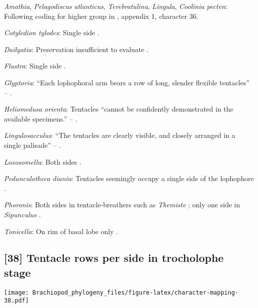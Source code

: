 \documentclass[openany]{book}
\theoremstyle{definition}
\theoremstyle{definition}
\theoremstyle{definition}
\theoremstyle{remark}
\begin{document}
\hypertarget{Amathia-coding-37}{}
\emph{Amathia}, \emph{Pelagodiscus atlanticus}, \emph{Terebratulina},
\emph{Lingula}, \emph{Coolinia pecten}: Following coding for higher
group in \citet{Carlson1995Phylogeneticrelationships}, appendix 1,
character 36.

\hypertarget{Cotyledion_tylodes-coding-37}{}
\emph{Cotyledion tylodes}: Single side \citep{Nielsen1966}.

\hypertarget{Dailyatia-coding-37}{}
\emph{Dailyatia}: Preservation insufficient to evaluate
\citep{Holmer2006Aspinose}.

\hypertarget{Flustra-coding-37}{}
\emph{Flustra}: Single side \citep{Temereva2016Thenervous}.

\hypertarget{Glyptoria-coding-37}{}
\emph{Glyptoria}: ``Each lophophoral arm bears a row of long, slender
flexible tentacles'' -- \citet{Zhang2009Architectureand}.

\hypertarget{Heliomedusa_orienta-coding-37}{}
\emph{Heliomedusa orienta}: Tentacles ``cannot be confidently
demonstrated in the available specimens.'' --
\citet{Zhang2007Rhynchonelliformeanbrachiopods}.

\hypertarget{Lingulosacculus-coding-37}{}
\emph{Lingulosacculus}: ``The tentacles are clearly visible, and closely
arranged in a single palisade'' -- \citet{Zhang2004Newdata}.

\hypertarget{Loxosomella-coding-37}{}
\emph{Loxosomella}: Both sides \citep{Schwaha2015, Shunkina2015}.

\hypertarget{Pedunculotheca_diania-coding-37}{}
\emph{Pedunculotheca diania}: Tentacles seemingly occupy a single side
of the lophophore \citep{Zhang2013}.

\hypertarget{Phoronis-coding-37}{}
\emph{Phoronis}: Both sides in tentacle-breathers such as
\emph{Themiste} \citep{Ruppert1995, Adrianov2006}; only one side in
\emph{Sipunculus} \citep{Ruppert1995, Adrianov2006}.

\hypertarget{Tonicella-coding-37}{}
\emph{Tonicella}: On rim of basal lobe only \citep{Morton1959}.

\subsection*{{[}38{]} Tentacle rows per side in trocholophe
stage}\label{tentacle-rows-per-side-in-trocholophe-stage}

\texttt{[image: Brachiopod\_phylogeny\_files/figure-latex/character-mapping-38.pdf]}
\end{document}
